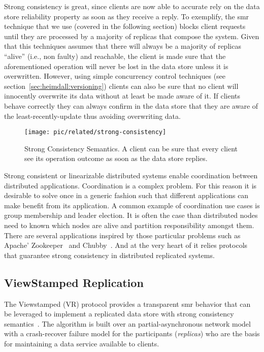 Strong consistency is great, since clients are now able to accurate rely on the data store reliability property as soon as they receive a reply. 
To exemplify, the \gls{smr} technique that we use (covered in the following section) blocks client requests until they are processed by a majority of replicas that compose the system. 
Given that this techniques assumes that there will always be a majority of replicas ``alive'' (i.e., non faulty) and reachable, the client is made sure that the aforementioned operation will never be lost in the data store unless it is overwritten. 
However, using simple concurrency control techniques (see section~\ref{sec:heimdall:versioning}) clients can also be sure that no client will innocently overwrite its data without at least  be made aware of it. 
If clients behave correctly they can always confirm in the data store that they are aware of the least-recently-update thus avoiding overwriting data.

\begin{figure}
  \centering
  \texttt{[image: pic/related/strong-consistency]}
  \caption[Strong Consistency Semantics]{Strong Consistency Semantics. A client can be sure that every client see its operation outcome as soon as the data store replies.}
  \label{fig:related:strong}
\end{figure}
Strong consistent or linearizable distributed systems enable coordination between distributed applications. 
Coordination is a complex problem. For this reason it is desirable to solve once in a generic fashion such that different applications can make benefit from its application. 
A common example of coordination use cases is group membership and leader election.
It is often the case than distributed nodes need to known which nodes are alive and partition responsibility amongst them. 
There are several applications inspired by those particular problems such as Apache' Zookeeper~\cite{Hun10} and Chubby~\cite{burrows2006chubby}. 
And at the very heart of it relies protocols that guarantee strong consistency in distributed replicated systems. 

\subsection{ViewStamped Replication}
\label{sec:related:viewst-repl}
The Viewstamped (VR) protocol provides a transparent \gls{smr}  behavior that can be leveraged to implement a replicated data store with strong consistency semantics~\cite{Liskov:2012ut,Liskov:2010vt}. 
The algorithm is built over  an partial-asynchronous network model with a crash-recover failure model for the participants (\emph{replicas}) who are the basis for maintaining a data service  available to clients. 


